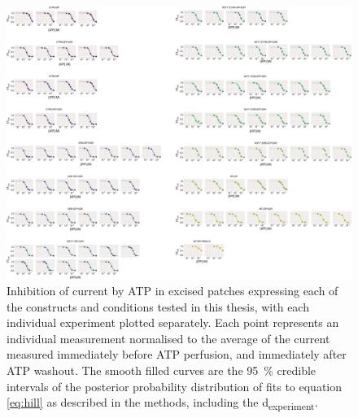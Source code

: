 \begin{figure}[h]
	\centering
	\includegraphics[width=\textwidth]{all_atp_fits_2.pdf}
	\caption[ATP inhibition sample hill fits]{
	{\bf{}}
	Inhibition of current by ATP in excised patches expressing each of the constructs and conditions tested in this thesis, with each individual experiment plotted separately.
	Each point represents an individual measurement normalised to the average of the current measured immediately before ATP perfusion, and immediately after ATP washout.
	The smooth filled curves are the \SI{95}{\percent} credible intervals of the posterior probability distribution of fits to equation \ref{eq:hill} as described in the methods, including the \textgreek{d}\textsubscript{experiment}.
	}
	\label{apxfig:atp_inhib_2}
\end{figure}

